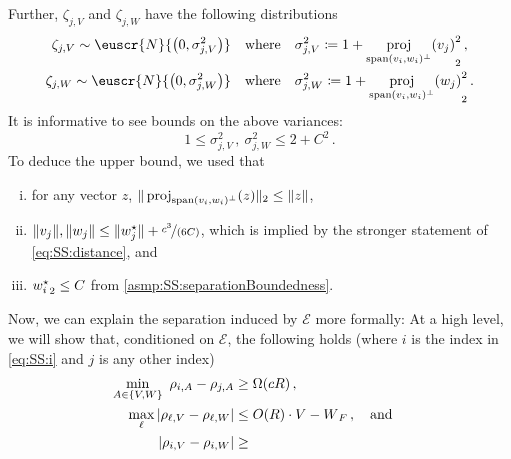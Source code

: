 \documentclass[11pt,letterpaper]{article}
\DeclareMathOperator{\proj}{proj}
\theoremstyle{plain}
\theoremstyle{definition}
\theoremstyle{remark}
\newcommand{\quadtext}[1]{\quad\text{#1}\quad}
\newcommand{\quadand}{\quadtext{and}}
\def\abs#1{\left| #1 \right|}
\newcommand{\inbrace}[1]{\ensuremath{\left\{#1\right\}}}
\newcommand{\inparen}[1]{\ensuremath{\left(#1\right)}}
\newcommand{\snorm}[1]{\ensuremath{\ensuremath{\| #1 \|}}}
\let\norm\relax
\newcommand{\norm}[1]{\ensuremath{\left\lVert #1 \right\rVert}}
\newcommand{\evE}{\ensuremath{\mathscr{E}}}
\newcommand{\nfrac}[2]{\nicefrac{#1}{#2}}
\newcommand{\customcal}[1]{\euscr{#1}}
\newcommand{\cN}{\customcal{N}}
\begin{document}
{{            Further, $\zeta_{j,V}$ and $\zeta_{j,W}$ have the following distributions
            \begin{equation}
                \begin{split}
                    \zeta_{j,V}\sim 
                        \cN{\inparen{0, \sigma_{j,V}^2}}
                        &\quadtext{where}
                        \sigma_{j,V}^2 \coloneqq 1 + \norm{\proj_{{\rm span}(v_i,w_i)^\bot}(v_j)}_2^2
                        \,,\\
                    \zeta_{j,W}\sim 
                    \cN{\inparen{0, \sigma_{j,W}^2}}
                        &\quadtext{where}
                        \sigma_{j,W}^2 \coloneqq 1 + \norm{\proj_{{\rm span}(v_i,w_i)^\bot}(w_j)}_2^2\,.
                \end{split}
                \label{eq:SS:distributionOfZeta}
            \end{equation}
            It is informative to see bounds on the above variances:
            \[
                1\leq \sigma_{j,V}^2\,,~\sigma_{j,W}^2\leq 2+C^2\,.
                \label{eq:SS:covarianceUB}
            \]
            To deduce the upper bound, we used that  
            \begin{enumerate}[(i),noitemsep]
                \item for any vector $z$, 
                \mbox{$\snorm{\proj_{{\rm span}(v_i,w_i)^\bot}(z)}_2\leq \snorm{z}$},
                \item $\snorm{v_j},\snorm{w_j}\leq \snorm{w_j^\star}+\nfrac{c^3}{(6C)}$,
                which is implied by the stronger statement of \cref{eq:SS:distance}, and
                \item $\norm{w_i^\star}_2\leq C$ from \cref{asmp:SS:separationBoundedness}.
            \end{enumerate} 
            Now, we can explain the separation induced by $\evE$ more formally:
            At a high level, we will show that, conditioned on $\evE$, the following holds (where $i$ is the index in \cref{eq:SS:i} and $j$ is any other index) 
            \begin{align*}
                \begin{split}
                    \min_{A\in \inbrace{V,W}}~\rho_{i,A} - \rho_{j,A} &\geq \Omega(cR)\,,\quad \\
                    \max_{\ell} \abs{\rho_{\ell,V} - \rho_{\ell,W}} &\leq O({R})\cdot \norm{V-W}_F\,, \quadand\\
                    \abs{\rho_{i,V} - \rho_{i,W}} &\geq 

\end{split}
\end{align*}}}
\end{document}
